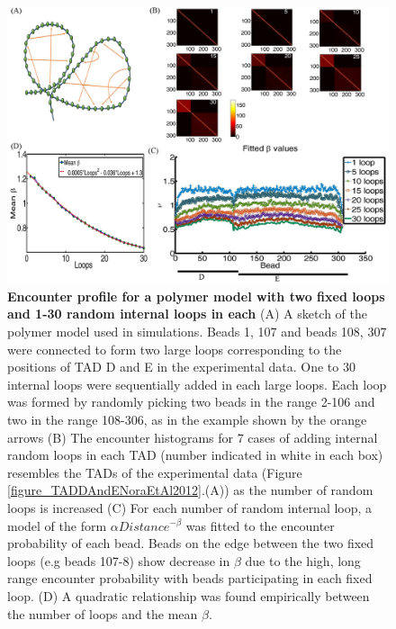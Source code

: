 \documentclass[12pt]{article}
\begin{document}
\begin{figure}[H]
\includegraphics[scale=0.7]{Figure04_TwoTADs0To30RandomLoops307Beads}
\caption{\textbf{Encounter profile for a polymer model with two fixed loops and 1-30 random internal loops in each} (A) A sketch of the polymer model used in simulations. Beads 1, 107 and beads 108, 307 were connected to form two large loops corresponding to the positions of TAD D and E in the experimental data. One to 30 internal loops were sequentially added in each large loops. Each loop was formed by randomly picking two beads in the range 2-106 and two in the range 108-306, as in the example shown by the orange arrows (B) The encounter histograms for 7 cases of adding internal random loops in each TAD (number indicated in white in each box) resembles the TADs of the experimental data (Figure \ref{figure_TADDAndENoraEtAl2012}.(A)) as the number of random loops is increased (C) For each number of random internal loop, a model of the form $\alpha Distance^{-\beta}$ was fitted to the encounter probability of each bead. Beads on the edge between the two fixed loops (e.g beads 107-8) show decrease in $\beta$ due to the high, long range encounter probability with beads participating in each fixed loop. (D) A quadratic relationship was found empirically between the number of loops and the mean $\beta$.}
\label{figure_encounterProfileTwoTADs}

\end{figure}



\end{document}
